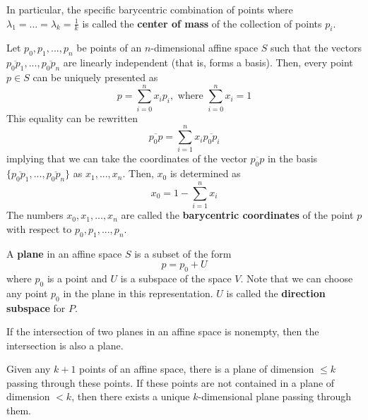   \begin{definition}
    In particular, the specific barycentric combination of points where $\lambda_1 = ... = \lambda_k = \frac{1}{k}$ is called the \textbf{center of mass} of the collection of points $p_i$. 
  \end{definition}

  \begin{definition}
    Let $p_0, p_1, ..., p_n$ be points of an $n$-dimensional affine space $S$ such that the vectors $\overline{p_0 p_1}, ..., \overline{p_0 p_n}$ are linearly independent (that is, forms a basis). Then, every point $p \in S$ can be uniquely presented as 
    \begin{equation}
      p = \sum_{i=0}^n x_i p_i, \text{ where } \sum_{i=0}^n x_i = 1
    \end{equation}
    This equality can be rewritten
    \begin{equation}
      \overline{p_0 p} = \sum_{i=1}^n x_i \overline{p_0 p_i}
    \end{equation}
    implying that we can take the coordinates of the vector $\overline{p_0 p}$ in the basis $\{ \overline{p_0 p_1}, ..., \overline{p_0 p_n}\}$ as $x_1, ..., x_n$. Then, $x_0$ is determined as 
    \begin{equation}
      x_0 = 1 - \sum_{i=1}^n x_i
    \end{equation}
    The numbers $x_0, x_1, ..., x_n$ are called the \textbf{barycentric coordinates} of the point $p$ with respect to $p_0, p_1, ..., p_n$. 
  \end{definition}

  \begin{definition}
    A \textbf{plane} in an affine space $S$ is a subset of the form 
    \begin{equation}
      p = p_0 + U
    \end{equation}
    where $p_0$ is a point and $U$ is a subspace of the space $V$. Note that we can choose any point $p_0$ in the plane in this representation. $U$ is called the \textbf{direction subspace} for $P$. 
  \end{definition}

  \begin{lemma}
    If the intersection of two planes in an affine space is nonempty, then the intersection is also a plane. 
  \end{lemma}

  \begin{theorem}
    Given any $k+1$ points of an affine space, there is a plane of dimension $\leq k$ passing through these points. If these points are not contained in a plane of dimension $< k$, then there exists a unique $k$-dimensional plane passing through them. 
  \end{theorem}

